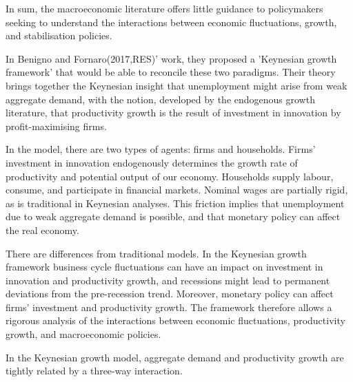 \documentclass[10pt,math=newtx,citestyle=gb7714-2015,bibstyle=gb7714-2015]{elegantbook}
\begin{document}
{{{	In sum, the macroeconomic literature offers little guidance to policymakers seeking to understand the interactions between economic fluctuations, growth, and stabilisation policies.
	
	In Benigno and Fornaro(2017,RES)' work,  they proposed a 'Keynesian growth framework' that would be able to reconcile these two paradigms. Their theory brings together the Keynesian insight that unemployment might arise from weak aggregate demand, with the notion, developed by the endogenous growth literature, that productivity growth is the result of investment in innovation by profit-maximising firms.
	
	In the model, there are two types of agents: firms and households. Firms' investment in innovation endogenously determines the growth rate of productivity and potential output of our economy. Households supply labour, consume, and participate in financial markets. Nominal wages are partially rigid, as is traditional in Keynesian analyses. This friction implies that unemployment due to weak aggregate demand is possible, and that monetary policy can affect the real economy.
	
	There are differences from traditional models. In the Keynesian growth framework business cycle fluctuations can have an impact on investment in innovation and productivity growth, and recessions might lead to permanent deviations from the pre-recession trend. Moreover, monetary policy can affect firms’ investment and productivity growth. The framework therefore allows a rigorous analysis of the interactions between economic fluctuations, productivity growth, and macroeconomic policies.
	
	In the Keynesian growth model, aggregate demand and productivity growth are tightly related by a three-way interaction.
	
}}}
\end{document}
